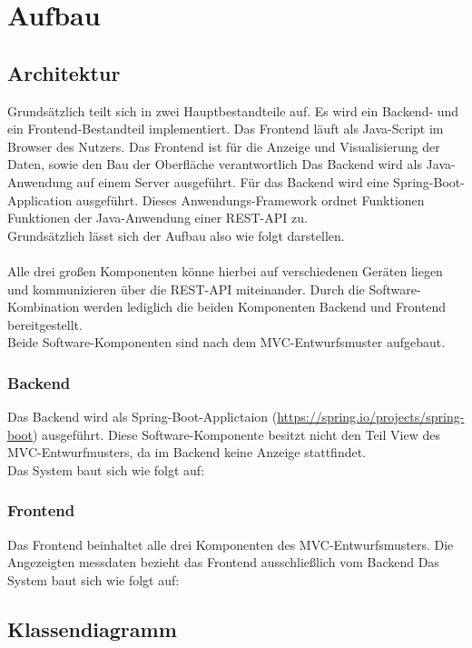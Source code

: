 \section{Aufbau}
\subsection{Architektur}
Grundsätzlich teilt sich \softwarename in zwei Hauptbestandteile auf.
Es wird ein Backend- und ein Frontend-Bestandteil implementiert.
Das Frontend läuft als Java-Script im Browser des Nutzers.
Das Frontend ist für die Anzeige und Visualisierung der Daten, sowie den Bau der Oberfläche verantwortlich
Das Backend wird als Java-Anwendung auf einem Server ausgeführt.
Für das Backend wird eine Spring-Boot-Application ausgeführt.
Dieses Anwendungs-Framework ordnet Funktionen Funktionen der Java-Anwendung einer REST-\gls{API} zu.
\\
Grundsätzlich lässt sich der Aufbau also wie folgt darstellen.
\\

\\
Alle drei großen Komponenten könne hierbei auf verschiedenen Geräten liegen und kommunizieren über die REST-API miteinander.
Durch die Software-Kombination \softwarename werden lediglich die beiden Komponenten \softwarename Backend und \softwarename Frontend bereitgestellt.
\\
Beide Software-Komponenten sind nach dem \gls{MVC}-Entwurfsmuster aufgebaut. 
\subsubsection{Backend}
Das Backend wird als Spring-Boot-Applictaion (\url{https://spring.io/projects/spring-boot}) ausgeführt.
Diese Software-Komponente besitzt nicht den Teil View des MVC-Entwurfmusters, da im Backend keine Anzeige stattfindet.
\\
Das System baut sich wie folgt auf:
\\

\subsubsection{Frontend}
Das Frontend beinhaltet alle drei Komponenten des \gls{MVC}-Entwurfsmusters. Die Angezeigten messdaten bezieht das \softwarename Frontend ausschließlich vom \softwarename Backend
Das System baut sich wie folgt auf:
\\


\subsection{Klassendiagramm}
